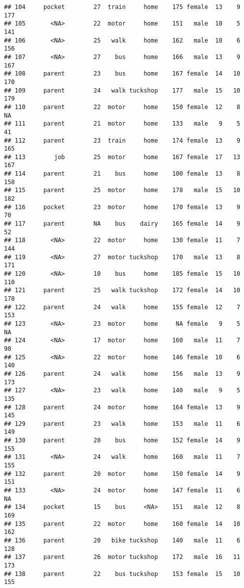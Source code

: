 \documentclass[
]{article}
\begin{document}
\begin{verbatim}
## 104     pocket        27  train     home    175 female  13    9     177
## 105       <NA>        22  motor     home    151   male  10    5     141
## 106       <NA>        25   walk     home    162   male  10    6     156
## 107       <NA>        27    bus     home    166   male  13    9     167
## 108     parent        23    bus     home    167 female  14   10     170
## 109     parent        24   walk tuckshop    177   male  15   10     179
## 110     parent        22  motor     home    150 female  12    8      NA
## 111     parent        21  motor     home    133   male   9    5      41
## 112     parent        23  train     home    174 female  13    9     165
## 113        job        25  motor     home    167 female  17   13     167
## 114     parent        21    bus     home    100 female  13    8     158
## 115     parent        25  motor     home    178   male  15   10     182
## 116     pocket        23  motor     home    170 female  13    9      70
## 117     parent        NA    bus    dairy    165 female  14    9      52
## 118       <NA>        22  motor     home    130 female  11    7     144
## 119       <NA>        27  motor tuckshop    170   male  13    8     171
## 120       <NA>        10    bus     home    185 female  15   10     110
## 121     parent        25   walk tuckshop    172 female  14   10     178
## 122     parent        24   walk     home    155 female  12    7     153
## 123       <NA>        23  motor     home     NA female   9    5      NA
## 124       <NA>        17  motor     home    160   male  11    7      90
## 125       <NA>        22  motor     home    146 female  10    6     140
## 126     parent        24   walk     home    156   male  13    9     173
## 127       <NA>        23   walk     home    140   male   9    5     135
## 128     parent        24  motor     home    164 female  13    9     145
## 129     parent        23   walk     home    153   male  11    6     149
## 130     parent        20    bus     home    152 female  14    9     155
## 131       <NA>        24   walk     home    160   male  11    7     155
## 132     parent        20  motor     home    150 female  14    9     151
## 133       <NA>        24  motor     home    147 female  11    6      NA
## 134     pocket        15    bus     <NA>    151   male  12    8     169
## 135     parent        22  motor     home    160 female  14   10     162
## 136     parent        20   bike tuckshop    140   male  11    6     128
## 137     parent        26  motor tuckshop    172   male  16   11     173
## 138     parent        22    bus tuckshop    153 female  15   10     155

\end{verbatim}
\end{document}
